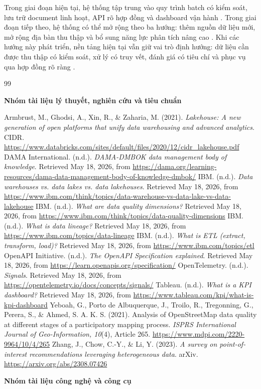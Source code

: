 \documentclass[12pt,a4paper]{article}
\begin{document}
Trong giai đoạn hiện tại, hệ thống tập trung vào quy trình batch có kiểm soát, lưu trữ document linh hoạt, API rõ hợp đồng và dashboard vận hành \cite{ibmETL}. Trong giai đoạn tiếp theo, hệ thống có thể mở rộng theo ba hướng: thêm nguồn dữ liệu mới, mở rộng địa bàn thu thập và bổ sung năng lực phân tích nâng cao \cite{zhang2023}. Khi các hướng này phát triển, nền tảng hiện tại vẫn giữ vai trò định hướng: dữ liệu cần được thu thập có kiểm soát, xử lý có truy vết, đánh giá có tiêu chí và phục vụ qua hợp đồng rõ ràng \cite{openapiSpec}.\par
\renewcommand{\refname}{Tài liệu tham khảo}
\begin{thebibliography}{99}
\item[]\textbf{Nhóm tài liệu lý thuyết, nghiên cứu và tiêu chuẩn}

 Armbrust, M., Ghodsi, A., Xin, R., \& Zaharia, M. (2021). \textit{Lakehouse: A new generation of open platforms that unify data warehousing and advanced analytics}. CIDR. \url{https://www.databricks.com/sites/default/files/2020/12/cidr_lakehouse.pdf}
 DAMA International. (n.d.). \textit{DAMA-DMBOK data management body of knowledge}. Retrieved May 18, 2026, from \url{https://dama.org/learning-resources/dama-data-management-body-of-knowledge-dmbok/}
 IBM. (n.d.). \textit{Data warehouses vs. data lakes vs. data lakehouses}. Retrieved May 18, 2026, from \url{https://www.ibm.com/think/topics/data-warehouse-vs-data-lake-vs-data-lakehouse}
 IBM. (n.d.). \textit{What are data quality dimensions?} Retrieved May 18, 2026, from \url{https://www.ibm.com/think/topics/data-quality-dimensions}
 IBM. (n.d.). \textit{What is data lineage?} Retrieved May 18, 2026, from \url{https://www.ibm.com/topics/data-lineage}
 IBM. (n.d.). \textit{What is ETL (extract, transform, load)?} Retrieved May 18, 2026, from \url{https://www.ibm.com/topics/etl}
 OpenAPI Initiative. (n.d.). \textit{The OpenAPI Specification explained}. Retrieved May 18, 2026, from \url{https://learn.openapis.org/specification/}
 OpenTelemetry. (n.d.). \textit{Signals}. Retrieved May 18, 2026, from \url{https://opentelemetry.io/docs/concepts/signals/}
 Tableau. (n.d.). \textit{What is a KPI dashboard?} Retrieved May 18, 2026, from \url{https://www.tableau.com/kpi/what-is-kpi-dashboard}
 Yeboah, G., Porto de Albuquerque, J., Troilo, R., Tregonning, G., Perera, S., \& Ahmed, S. A. K. S. (2021). Analysis of OpenStreetMap data quality at different stages of a participatory mapping process. \textit{ISPRS International Journal of Geo-Information, 10}(4), Article 265. \url{https://www.mdpi.com/2220-9964/10/4/265}
 Zhang, J., Chow, C.-Y., \& Li, Y. (2023). \textit{A survey on point-of-interest recommendations leveraging heterogeneous data}. arXiv. \url{https://arxiv.org/abs/2308.07426}
\item[]\textbf{Nhóm tài liệu công nghệ và công cụ}


\end{thebibliography}
\end{document}
